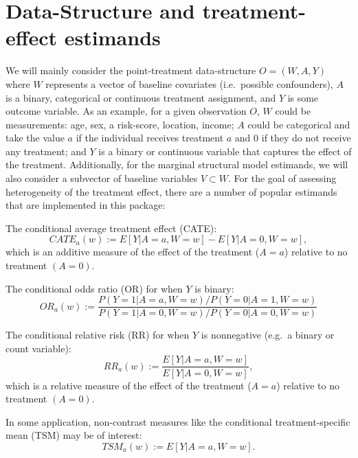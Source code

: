 \documentclass[
]{jss}
\begin{document}
\section{Data-Structure and treatment-effect estimands}

We will mainly consider the point-treatment data-structure
\(O = (W,A,Y)\) where \(W\) represents a vector of baseline covariates
(i.e.~possible confounders), \(A\) is a binary, categorical or
continuous treatment assignment, and \(Y\) is some outcome variable. As
an example, for a given observation \(O\), \(W\) could be measurements:
age, sex, a risk-score, location, income; \(A\) could be categorical and
take the value \(a\) if the individual receives treatment \(a\) and
\(0\) if they do not receive any treatment; and \(Y\) is a binary or
continuous variable that captures the effect of the treatment.
Additionally, for the marginal structural model estimands, we will also
consider a subvector of baseline variables \(V \subset W\). For the goal
of assessing heterogeneity of the treatment effect, there are a number
of popular estimands that are implemented in this package:

\noindent The conditional average treatment effect (CATE):
\begin{equation}
CATE_{a}(w) := E[Y|A=a,W=w] - E[Y|A=0, W=w],
\end{equation} which is an additive measure of the effect of the
treatment (\(A=a\)) relative to no treatment \((A=0)\).

\vspace{0.5cm}

\noindent The conditional odds ratio (OR) for when \(Y\) is binary:
\begin{equation}
OR_a(w) := \frac{P(Y=1|A=a,W=w)/P(Y=0|A=1,W=w)}{P(Y=1|A=0,W=w)/P(Y=0|A=0,W=w)}
\end{equation}

\vspace{0.5cm}

\noindent The conditional relative risk (RR) for when \(Y\) is
nonnegative (e.g.~a binary or count variable): \begin{equation}
RR_a(w) := \frac{E[Y|A=a,W=w]}{E[Y|A=0,W=w]},
\end{equation} which is a relative measure of the effect of the
treatment (\(A=a\)) relative to no treatment \((A=0)\).

\vspace{0.5cm}

\noindent In some application, non-contrast measures like the
conditional treatment-specific mean (TSM) may be of interest:
\begin{equation}
TSM_a(w) := E[Y|A=a,W=w].
\end{equation}
\end{document}
